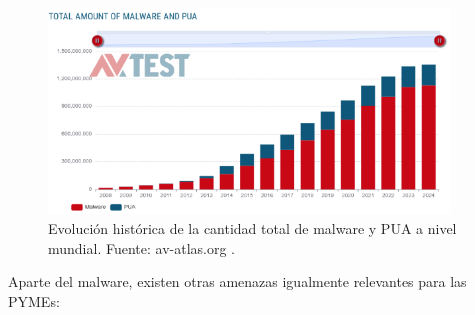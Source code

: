 \documentclass[a4paper, 10pt]{article}
\begin{document}
\vspace{0.3cm}

\begin{figure}[H]
    \centering
    \includegraphics[width=0.95\textwidth]{images/malware.png}
    \caption{Evolución histórica de la cantidad total de malware y PUA a nivel mundial. Fuente: av-atlas.org \cite{avtest}.}
\end{figure}

\vspace{0.5cm}

Aparte del malware, existen otras amenazas igualmente relevantes para las PYMEs:
\end{document}

